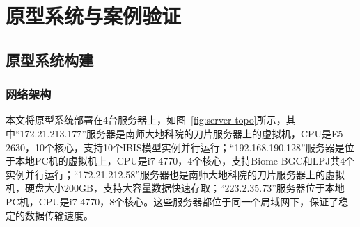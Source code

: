 \chapter{原型系统与案例验证}
\section{原型系统构建}
\subsection{网络架构}
本文将原型系统部署在4台服务器上，如图~\ref{fig:server-topo}所示，其中“172.21.213.177”服务器是南师大地科院的刀片服务器上的虚拟机，CPU是E5-2630，10个核心，支持10个IBIS模型实例并行运行；“192.168.190.128”服务器是位于本地PC机的虚拟机上，CPU是i7-4770，4个核心，支持Biome-BGC和LPJ共4个实例并行运行；“172.21.212.58”服务器也是南师大地科院的刀片服务器上的虚拟机，硬盘大小200GB，支持大容量数据快速存取；“223.2.35.73”服务器位于本地PC机，CPU是i7-4770，8个核心。这些服务器都位于同一个局域网下，保证了稳定的数据传输速度。


